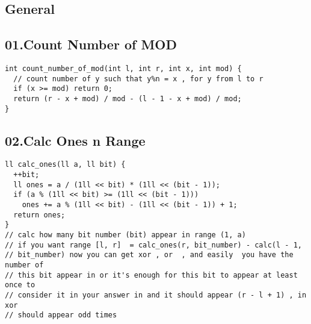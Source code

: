 \documentclass[twoside]{article}
\begin{document}
\begin{multicols*}{2}
{
\section*{General}
}
{
\subsection*{01.Count Number of MOD}
}
\begin{verbatim}
int count_number_of_mod(int l, int r, int x, int mod) {
  // count number of y such that y%n = x , for y from l to r
  if (x >= mod) return 0;
  return (r - x + mod) / mod - (l - 1 - x + mod) / mod;
}
\end{verbatim}

{
\subsection*{02.Calc Ones n Range}
}
\begin{verbatim}
ll calc_ones(ll a, ll bit) {
  ++bit;
  ll ones = a / (1ll << bit) * (1ll << (bit - 1));
  if (a % (1ll << bit) >= (1ll << (bit - 1)))
    ones += a % (1ll << bit) - (1ll << (bit - 1)) + 1;
  return ones;
}
// calc how many bit number (bit) appear in range (1, a)
// if you want range [l, r]  = calc_ones(r, bit_number) - calc(l - 1,
// bit_number) now you can get xor , or  , and easily  you have the number of
// this bit appear in or it's enough for this bit to appear at least once to
// consider it in your answer in and it should appear (r - l + 1) , in xor
// should appear odd times
\end{verbatim}


\end{multicols*}
\end{document}
